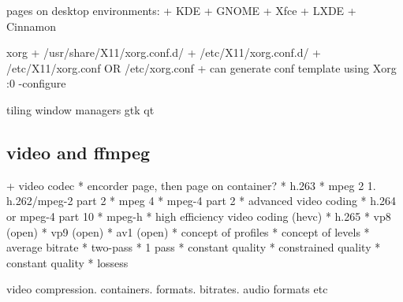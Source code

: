 pages on desktop environments:
+ KDE
+ GNOME
+ Xfce
+ LXDE
+ Cinnamon

xorg
+ /usr/share/X11/xorg.conf.d/
+ /etc/X11/xorg.conf.d/
+ /etc/X11/xorg.conf OR /etc/xorg.conf
+ can generate conf template using Xorg :0 -configure

tiling window managers
gtk
qt
\subsection{video and ffmpeg}
+ video codec
  * encorder page, then page on container?
  * h.263
  * mpeg 2
    1. h.262/mpeg-2 part 2
  * mpeg 4
    * mpeg-4 part 2
    * advanced video coding
    * h.264 or mpeg-4 part 10
  * mpeg-h
    * high efficiency video coding (hevc)
    * h.265
  * vp8 (open)
  * vp9 (open)
  * av1 (open)
  * concept of profiles
  * concept of levels
  * average bitrate
  * two-pass
  * 1 pass
  * constant quality
  * constrained quality
  * constant quality
  * lossess

video compression. containers. formats. bitrates. audio formats etc


